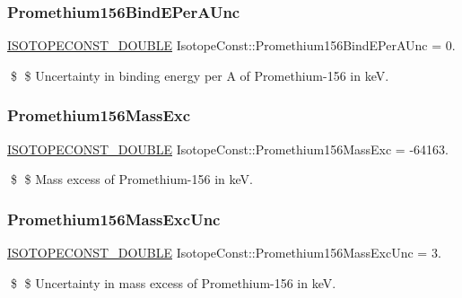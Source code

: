 \subsubsection{\texorpdfstring{Promethium156\+Bind\+E\+Per\+A\+Unc}{Promethium156BindEPerAUnc}}
{\footnotesize\ttfamily \mbox{\hyperlink{group___isotope_const-_macros_ga8f45a7272ce02c0b4c65c44636ed719a}{I\+S\+O\+T\+O\+P\+E\+C\+O\+N\+S\+T\+\_\+\+D\+O\+U\+B\+LE}} Isotope\+Const\+::\+Promethium156\+Bind\+E\+Per\+A\+Unc = 0.}

\$ \$ Uncertainty in binding energy per A of Promethium-\/156 in keV. \mbox{\label{group___isotope_const-_promethium-_pm156_gab9ea0057b4b548d8423b6b03e88a2a4f}} 
\subsubsection{\texorpdfstring{Promethium156\+Mass\+Exc}{Promethium156MassExc}}
{\footnotesize\ttfamily \mbox{\hyperlink{group___isotope_const-_macros_ga8f45a7272ce02c0b4c65c44636ed719a}{I\+S\+O\+T\+O\+P\+E\+C\+O\+N\+S\+T\+\_\+\+D\+O\+U\+B\+LE}} Isotope\+Const\+::\+Promethium156\+Mass\+Exc = -\/64163.}

\$ \$ Mass excess of Promethium-\/156 in keV. \mbox{\label{group___isotope_const-_promethium-_pm156_ga21f8525532e920517e24984b79260344}} 
\subsubsection{\texorpdfstring{Promethium156\+Mass\+Exc\+Unc}{Promethium156MassExcUnc}}
{\footnotesize\ttfamily \mbox{\hyperlink{group___isotope_const-_macros_ga8f45a7272ce02c0b4c65c44636ed719a}{I\+S\+O\+T\+O\+P\+E\+C\+O\+N\+S\+T\+\_\+\+D\+O\+U\+B\+LE}} Isotope\+Const\+::\+Promethium156\+Mass\+Exc\+Unc = 3.}

\$ \$ Uncertainty in mass excess of Promethium-\/156 in keV. \mbox{\label{group___isotope_const-_promethium-_pm156_ga1532e9cfeff2948e63f30f372d00c55f}} 

